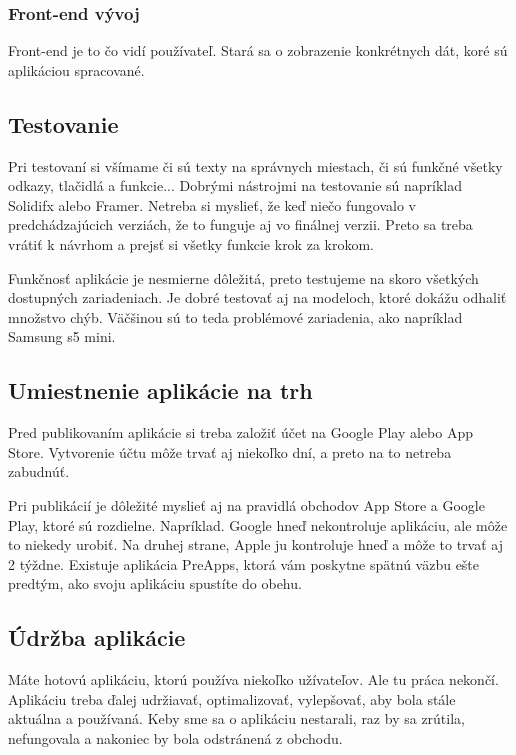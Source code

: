 \documentclass[10pt,twoside,slovak,a4paper]{article}
\begin{document}
\cite{vivantina, wikigis}


\subsubsection{Front-end vývoj}
\quad Front-end je to čo vidí používateľ. Stará sa o zobrazenie konkrétnych dát, koré sú aplikáciou spracované.

\cite{pixelfield}



\subsection{Testovanie}
\quad Pri testovaní si všímame či sú texty na správnych miestach, či sú funkčné všetky odkazy, tlačidlá a funkcie... Dobrými nástrojmi na testovanie sú napríklad Solidifx alebo Framer. Netreba si myslieť, že keď niečo fungovalo v predchádzajúcich verziách, že to funguje aj vo finálnej verzii. Preto sa treba vrátiť k návrhom a prejsť si všetky funkcie krok za krokom.

Funkčnosť aplikácie je nesmierne dôležitá, preto testujeme na skoro všetkých dostupných zariadeniach. Je dobré testovať aj na modeloch, ktoré dokážu odhaliť množstvo chýb. Väčšinou sú to teda problémové zariadenia, ako napríklad Samsung s5 mini.

\cite{EMM2, buildfire, elite}



\subsection{Umiestnenie aplikácie na trh}
\quad Pred publikovaním aplikácie si treba založiť  účet na Google Play alebo App Store. Vytvorenie účtu môže trvať aj niekoľko dní, a preto na to netreba zabudnúť.

Pri publikácií je dôležité myslieť aj na pravidlá obchodov App Store a Google Play, ktoré sú rozdielne. Napríklad. Google hneď nekontroluje aplikáciu, ale môže to niekedy urobiť. Na druhej strane, Apple ju kontroluje hneď a môže to trvať aj 2 týždne. Existuje aplikácia PreApps, ktorá vám poskytne spätnú väzbu ešte predtým, ako svoju aplikáciu spustíte do obehu.

\cite{EMM2}



\subsection{Údržba aplikácie}
\quad Máte hotovú aplikáciu, ktorú používa niekoľko užívateľov. Ale tu práca nekončí. Aplikáciu treba ďalej udržiavať, optimalizovať, vylepšovať, aby bola stále aktuálna a používaná. Keby sme sa o aplikáciu nestarali, raz by sa zrútila, nefungovala a nakoniec by bola odstránená z obchodu.
\end{document}
